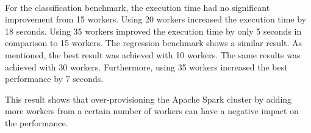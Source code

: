 \paragraph{}
For the classification benchmark, the execution time had no significant improvement from 15 workers. Using 20 workers increased the execution time by 18 seconds. Using 35 workers improved the execution time by only 5 seconds in comparison to 15 workers.
The regression benchmark shows a similar result. As mentioned, the best result was achieved with 10 workers. The same results was achieved with 30 workers. Furthermore, using 35 workers increased the best performance by 7 seconds.


This result shows that over-provisioning the Apache Spark cluster by adding more workers from a certain number of workers can have a negative impact on the performance.


